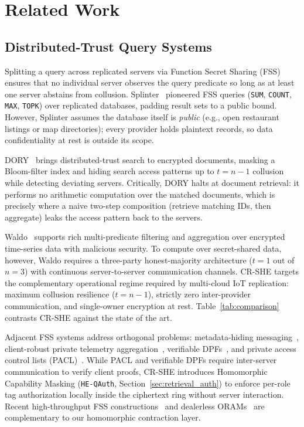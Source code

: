 \documentclass[11pt,a4paper]{article}
\begin{document}
\section{Related Work}\label{sec:related}

\subsection{Distributed-Trust Query Systems}
Splitting a query across replicated servers via Function Secret Sharing (FSS)~\cite{gilboa2014,boyle2015,boyle2016} ensures that no individual server observes the query predicate so long as at least one server abstains from collusion. Splinter~\cite{wang2017} pioneered FSS queries (\texttt{SUM}, \texttt{COUNT}, \texttt{MAX}, \texttt{TOPK}) over replicated databases, padding result sets to a public bound. However, Splinter assumes the database itself is \textit{public} (e.g., open restaurant listings or map directories); every provider holds plaintext records, so data confidentiality at rest is outside its scope.

DORY~\cite{dauterman2020} brings distributed-trust search to encrypted documents, masking a Bloom-filter index and hiding search access patterns up to $t = n - 1$ collusion while detecting deviating servers. Critically, DORY halts at document retrieval: it performs no arithmetic computation over the matched documents, which is precisely where a naive two-step composition (retrieve matching IDs, then aggregate) leaks the access pattern back to the servers.

Waldo~\cite{dauterman2022} supports rich multi-predicate filtering and aggregation over encrypted time-series data with malicious security. To compute over secret-shared data, however, Waldo requires a three-party honest-majority architecture ($t = 1$ out of $n = 3$) with continuous server-to-server communication channels. CR-SHE targets the complementary operational regime required by multi-cloud IoT replication: maximum collusion resilience ($t = n - 1$), strictly zero inter-provider communication, and single-owner encryption at rest. Table~\ref{tab:comparison} contrasts CR-SHE against the state of the art.

Adjacent FSS systems address orthogonal problems: metadata-hiding messaging~\cite{eskandarian2021}, client-robust private telemetry aggregation~\cite{corrigan2017,boneh2021}, verifiable DPFs~\cite{decastro2022}, and private access control lists (PACL)~\cite{servan2023}. While PACL and verifiable DPFs require inter-server communication to verify client proofs, CR-SHE introduces Homomorphic Capability Masking (\texttt{HE-QAuth}, Section~\ref{sec:retrieval_auth}) to enforce per-role tag authorization locally inside the ciphertext ring without server interaction. Recent high-throughput FSS constructions~\cite{storrier2023} and dealerless ORAMs~\cite{doerner2017} are complementary to our homomorphic contraction layer.
\end{document}
